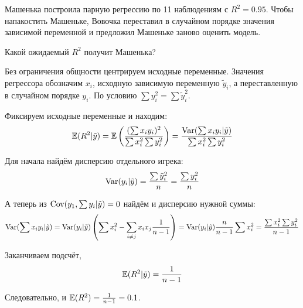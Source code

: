 \begin{problem}
Машенька построила парную регрессию по 11 наблюдениям с $R^2=0.95$. Чтобы напакостить Машеньке, Вовочка переставил в случайном порядке значения зависимой переменной и предложил Машеньке заново оценить модель.

Какой ожидаемый $R^2$ получит Машенька?
\begin{sol}
Без ограничения общности центрируем исходные переменные. 
Значения регрессора обозначим $x_i$, исходную зависимую переменную $\tilde{y}_i$, а переставленную в случайном порядке $y_i$. 
По условию $\sum y_i^2 = \sum \tilde{y}_i^2$.

Фиксируем исходные переменные и находим:
\[
\mathbb{E}(R^2 | \tilde{y}) = \mathbb{E}\left( \frac{(\sum x_i y_i )^2}{\sum x_i^2 \sum y_i^2}  \right) = 
\frac{\operatorname{Var}(\sum x_i y_i | \tilde{y})}{\sum x_i^2 \sum y_i^2}
\]

Для начала найдём дисперсию отдельного игрека:
\[
\operatorname{Var}(y_i | \tilde{y}) = \frac{\sum \tilde{y}_i^2}{n} = \frac{\sum y_i^2}{n}
\]

А теперь из $\operatorname{Cov}(y_1, \sum y_i | \tilde{y}) =0$ найдём и дисперсию нужной суммы:
\[
\operatorname{Var}(\sum x_i y_i | \tilde{y}) = 
\operatorname{Var}(y_i | \tilde{y}) \left(  \sum x_i^2 - \sum_{i\neq j} x_i x_j \frac{1}{n-1}  \right) = 
\operatorname{Var}(y_i | \tilde{y}) \frac{n}{n-1} \sum x_i^2 = \frac{\sum x_i^2 \sum y_i^2 }{n-1}
\]

Заканчиваем подсчёт,
\[
\mathbb{E}(R^2 | \tilde{y}) = \frac{1}{n-1}
\]

Следовательно, и $\mathbb{E}(R^2) = \frac{1}{n-1} = 0.1$.
\end{sol}
\end{problem}


